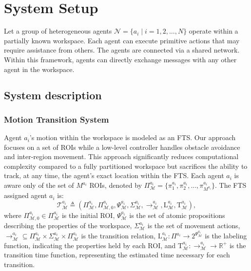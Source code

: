 
\section{System Setup} \label{sec:problem}
Let a group of heterogeneous agents $\mathcal{N} = \{a_i \mid i=1,2,...,N\}$ operate within a partially known workspace. Each agent can execute primitive actions that may require assistance from others. The agents are connected via a shared network. Within this framework, agents can directly exchange messages with any other agent in the workspace. %
\subsection{System description}
\subsubsection{Motion Transition System} \label{subsec:motion-ts}
Agent $a_i$'s motion within the workspace is modeled as an FTS. Our approach focuses on a set of ROIs while a low-level controller handles obstacle avoidance and inter-region movement. This approach significantly reduces computational complexity compared to a fully partitioned workspace but sacrifices the ability to track, at any time, the agent's exact location within the FTS. Each agent $a_i$ is aware only of the set of $M^{a_i}$ ROIs, denoted by $\Pi^{a_i}_{\mathcal{M}}=\{\pi^{a_i}_1,\pi^{a_i}_2,...,\pi^{a_i}_{M^{a_i}}\}$. The FTS assigned agent $a_i$ is:
\begin{equation} \label{eq:motion-fts} \mathcal{T}^{a_i}_{\mathcal{M}}\triangleq\left(\Pi^{a_i}_{\mathcal{M}}, \Pi^{a_i}_{\mathcal{M},0}, \Psi^{a_i}_{\mathcal{M}}, \Sigma^{a_i}_{\mathcal{M}}, \longrightarrow^{a_i}_{\mathcal{M}}, \mathrm{L}^{a_i}_{\mathcal{M}}, \mathrm{T}^{a_i}_{\mathcal{M}}\right),  
\end{equation}
where $\Pi^{a_i}_{\mathcal{M},0}\in\Pi^{a_i}_{\mathcal{M}}$ is the initial ROI, $\Psi^{a_i}_{\mathcal{M}}$ is the set of atomic propositions describing the properties of the workspace, $\Sigma^{a_i}_{\mathcal{M}}$ is the set of movement actions, $\longrightarrow^{a_i}_{\mathcal{M}}\subseteq \Pi^{a_i}_{\mathcal{M}}\times\Sigma^{a_i}_{\mathcal{M}}\times\Pi^{a_i}_{\mathcal{M}}$ is the transition relation, $\mathrm{L}^{a_i}_{\mathcal{M}}:\Pi^{a_i}\rightarrow2^{\Psi^{a_i}_{\mathcal{M}}}$ is the labeling function, indicating the properties held by each ROI, and $\mathrm{T} ^{a_i}_{\mathcal{M}}:\longrightarrow^{a_i}_{\mathcal{M}}\rightarrow\mathbb{R}^+$ is the transition time function, representing the estimated time necessary for each transition.


